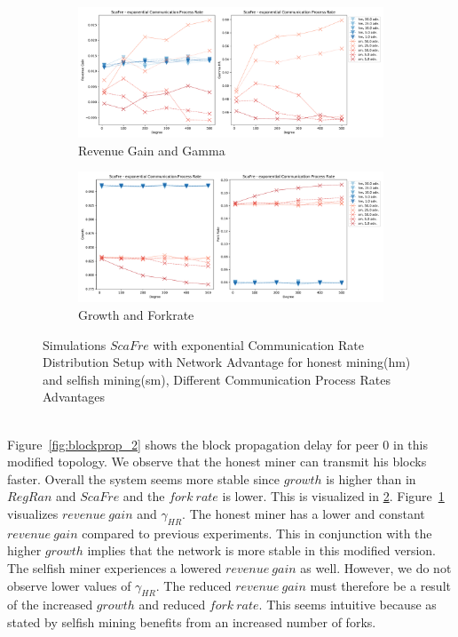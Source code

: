 \begin{figure}[tbp]
	\begin{subfigure}[b]{\textwidth}
		\includegraphics[width=\textwidth]{figures/revenue_gamma_barabasi_bc_dc.pdf}
		\caption{Revenue Gain and Gamma}
		\label{fig:revgain_bc_dc}
	\end{subfigure}
	\begin{subfigure}[b]{\textwidth}
		\includegraphics[width=\textwidth]{figures/growth_forkrate_barabasi_bc_dc.pdf}
		\caption{Growth and Forkrate}
		\label{fig:growth_bc_dc}
	\end{subfigure}
\caption{Simulations $ScaFre$ with exponential Communication Rate Distribution Setup with Network Advantage for honest mining(hm) and selfish mining(sm), Different Communication Process Rates Advantages}
\label{fig:bc_dc}
\end{figure}\\
Figure~\ref{fig:blockprop_2} shows the block propagation delay for peer $0$ in this modified topology. We observe that the honest miner can transmit his blocks faster. Overall the system seems more stable since $growth$ is higher than in $RegRan$ and $ScaFre$ and the $fork~rate$ is lower. This is visualized in \ref{fig:growth_bc_dc}. Figure~\ref{fig:revgain_bc_dc} visualizes $revenue~gain$ and $\gamma_{HR}$. The honest miner has a lower and constant $revenue~gain$ compared to previous experiments. This in conjunction with the higher $growth$ implies that the network is more stable in this modified version. The selfish miner experiences a lowered $revenue~gain$ as well. However, we do not observe lower values of $\gamma_{HR}$. The reduced $revenue~gain$ must therefore be a result of the increased $growth$ and reduced $fork~rate$. This seems intuitive because as stated by  selfish mining benefits from an increased number of forks.\\

